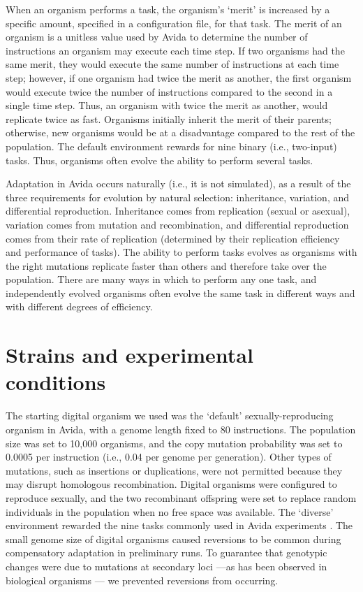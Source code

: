 \documentclass[11pt]{article}
\begin{document}
When an organism performs a task, the organism's `merit' is increased
by a specific amount, specified in a configuration file, for that task.
%
The merit of an organism is a unitless value used by Avida
to determine the number of instructions an organism may execute each time step.
%
If two organisms had the same merit,
they would execute the same number of instructions at each time step;
however, if one organism had twice the merit as another,
the first organism would execute twice the number of instructions
compared to the second in a single time step.
%
Thus, an organism with twice the merit as another,
would replicate twice as fast.
%
Organisms initially inherit the merit of their parents;
otherwise, new organisms would be at a disadvantage
compared to the rest of the population.
%
The default environment rewards for nine binary (i.e., two-input) tasks.
%
Thus, organisms often evolve the ability to perform several tasks.



Adaptation in Avida occurs naturally (i.e., it is not simulated),
as a result of the three requirements for evolution by natural selection:
inheritance, variation, and differential reproduction.
%
Inheritance comes from replication (sexual or asexual),
variation comes from mutation and recombination,
and differential reproduction comes from their rate of replication
(determined by their replication efficiency and performance of tasks).
%
The ability to perform tasks evolves as organisms with the right mutations
replicate faster than others and therefore take over the population.
%
There are many ways in which to perform any one task,
and independently evolved organisms often evolve the same task
in different ways and with different degrees of efficiency.



\section*{Strains and experimental conditions}

The starting digital organism we used was the `default' sexually-reproducing
organism in Avida, with a genome length fixed to 80 instructions.
%
The population size was set to 10,000 organisms,
and the copy mutation probability was set to 0.0005 per instruction
(i.e., 0.04 per genome per generation).
%
Other types of mutations, such as insertions or duplications,
were not permitted because they may disrupt homologous recombination.
%
Digital organisms were configured to reproduce sexually,
and the two recombinant offspring were set to replace random individuals
in the population when no free space was available.
%
The `diverse' environment rewarded the nine tasks
commonly used in Avida experiments \cite{len03}.
%
The small genome size of digital organisms caused reversions
to be common during compensatory adaptation in preliminary runs.
%
To guarantee that genotypic changes were due to mutations at secondary loci%
---as has been observed in biological organisms \cite{bur99,est11}---%
we prevented reversions from occurring.
\end{document}
